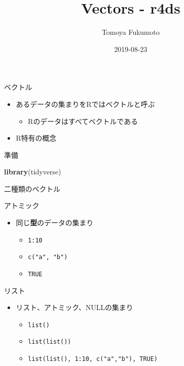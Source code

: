 \documentclass[ignorenonframetext,]{beamer}
\title{Vectors - r4ds}
\author{Tomoya Fukumoto}
\date{2019-08-23}
\newenvironment{Shaded}{\begin{snugshade}}{\end{snugshade}}
\newcommand{\KeywordTok}[1]{\textcolor[rgb]{0.13,0.29,0.53}{\textbf{#1}}}
\newcommand{\NormalTok}[1]{#1}
\providecommand{\tightlist}{%
  \setlength{\itemsep}{0pt}\setlength{\parskip}{0pt}}
\begin{document}
\frame{\titlepage}

\begin{frame}[fragile]{ベクトル}

\begin{itemize}
\tightlist
\item
  あるデータの集まりをRではベクトルと呼ぶ

  \begin{itemize}
  \tightlist
  \item
    Rのデータはすべてベクトルである
  \end{itemize}
\item
  R特有の概念
\end{itemize}

\begin{block}{準備}

\begin{Shaded}
\begin{Highlighting}[]
\KeywordTok{library}\NormalTok{(tidyverse)}
\end{Highlighting}
\end{Shaded}

\end{block}

\end{frame}

\begin{frame}[fragile]{二種類のベクトル}

\begin{block}{アトミック}

\begin{itemize}
\tightlist
\item
  同じ\textbf{型}のデータの集まり

  \begin{itemize}
  \tightlist
  \item
    \texttt{1:10}
  \item
    \texttt{c("a",\ "b")}
  \item
    \texttt{TRUE}
  \end{itemize}
\end{itemize}

\end{block}

\begin{block}{リスト}

\begin{itemize}
\tightlist
\item
  リスト、アトミック、NULLの集まり

  \begin{itemize}
  \tightlist
  \item
    \texttt{list()}
  \item
    \texttt{list(list())}
  \item
    \texttt{list(list(),\ 1:10,\ c("a","b"),\ TRUE)}
  \end{itemize}
\end{itemize}

\end{block}

\end{frame}
\end{document}
